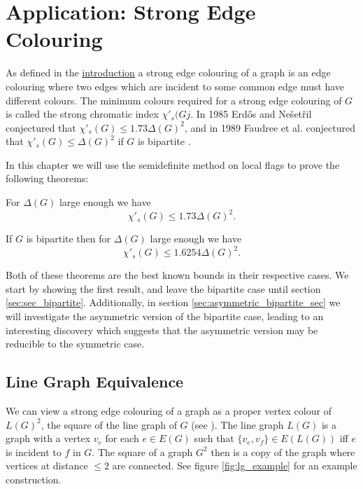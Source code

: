 \chapter{Application: Strong Edge Colouring}
\label{chap:strong_edge_colouring}

As defined in the \hyperref[sec:intro_strong_edge_coloring]{introduction}
a strong edge colouring of a graph is an edge colouring where two edges which are incident to some
common edge must have different colours. The minimum colours required for a strong edge colouring of
$G$ is called the strong chromatic index $\chi'_s(Gj$.
In 1985 Erd\H{o}s and Nešetřil conjectured that
$\chi'_s(G) \leq 1.73\Delta(G)^2$, and in 1989 Faudree et al. conjectured that
$\chi'_s(G) \leq \Delta(G)^2$ if $G$ is bipartite \cite{faudreeInducedMatchingsBipartite1989}.

In this chapter we will use the semidefinite method on local flags to prove the following
theorems:
\begin{knowntheorem}
    For $\Delta(G)$ large enough we have
    \[\chi'_s(G) \leq 1.73\Delta(G)^2.\]
\end{knowntheorem}
\begin{knowntheorem}
    If $G$ is bipartite then for $\Delta(G)$ large enough we have
    \[\chi'_s(G) \leq 1.6254\Delta(G)^2.\]
\end{knowntheorem}
Both of these theorems are the best known bounds in their respective cases. We start
by showing the first result, and leave the bipartite case until section
\ref{sec:sec_bipartite}.
Additionally, in section
\ref{sec:asymmetric_bipartite_sec} we will investigate the asymmetric version of the
bipartite case, leading to an interesting discovery which suggests that the asymmetric
version may be reducible to the symmetric case.

\section{Line Graph Equivalence}

We can view a strong edge colouring of a graph as a proper vertex colour of $L(G)^2$, the
square of the line graph of $G$ (see \cite{molloyBoundStrongChromatic1997}).
The line graph $L(G)$ is a graph with a vertex $v_e$ for
each $e\in E(G)$ such that $\{v_e, v_f\} \in E(L(G))$ iff $e$ is incident to $f$ in
$G$. The square of a graph $G^2$ then is a copy of the graph where vertices at distance $\leq 2$
are connected. See figure \ref{fig:lg_example} for an example construction.

